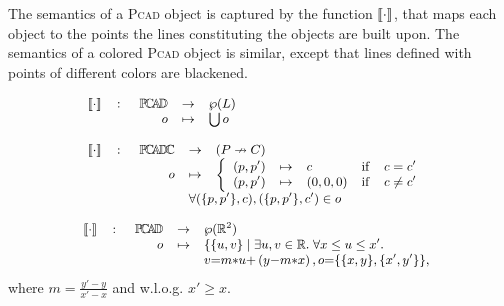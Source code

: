 \begin{Definition}
The semantics of a \textsc{Pcad} object is captured by the function 
$\llbracket \cdot \rrbracket$, that maps each object to the points the lines constituting the 
objects are built upon. The semantics of a colored \textsc{Pcad} object is 
similar, except that lines defined with points of different colors are 
blackened.
\begin{olddef}
\begin{displaymath}
\begin{small}
\begin{array}{rcl}
\SMapping & \colon & \!\!\!
\begin{array}[t]{rcl}
         \PCAD &\to& \wp(L) \\
         o &\mapsto& \bigcup o\\
\end{array}\\\\

\SMapping & \colon & \!\!\!

\begin{array}[t]{rcl}
         \PCADC &\to& (P \nrightarrow C)\\
         o &\mapsto& \left\{ \begin{array}{rclcl}
            (p, p') &\mapsto& c & \mathrm{if} & c = c'\\
            (p, p') &\mapsto& (0,0,0) & \mathrm{if} & c \neq c'\\ 
         \end{array}\right. \\
         & \multicolumn{2}{l}{\forall (\{p, p'\}, c), (\{p, p'\}, c') \in o}\\
\end{array}

\end{array}
\end{small}
\end{displaymath}
\end{olddef}
\begin{newdef}
\begin{displaymath}
\begin{small}
\begin{array}{rcl}
\SMapping & \colon & \!\!\!
\begin{array}[t]{rcl}
\PCAD &\to& \wp(\mathbb{R}^2) \\
o &\mapsto& \lbrace \lbrace u,v\rbrace \;|\; \exists u,v\in \mathbb{R}.\; 
                                             \forall x \leq u \leq x'. \\
& & v{=}m{*}u{+}\left(y{-}m{*}x\right), o{=}\lbrace \lbrace x, y \rbrace, \lbrace x', y' \rbrace \rbrace,
\end{array}\\
\end{array}
\end{small}
\end{displaymath}
\noindent 
where $m = \frac{y'-y}{x'-x}$ and w.l.o.g. $x' \geq x$.

\end{newdef}

\end{Definition}

